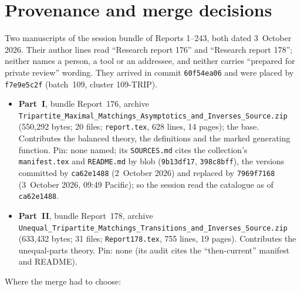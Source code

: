 \documentclass[11pt,letterpaper]{article}
\theoremstyle{remark}\newtheorem{remark}[theorem]{Remark}
\newcommand{\file}[1]{\nolinkurl{#1}}
\begin{document}
\section*{Provenance and merge decisions}\label{tmm:sec:provenance}
Two manuscripts of the session bundle of Reports 1--243, both dated 3~October 2026. Their author lines read ``Research report 176'' and ``Research report 178''; neither names a person, a tool or an addressee, and neither carries ``prepared for private review'' wording. They arrived in commit \texttt{60f54ea06} and were placed by \texttt{f7e9e5c2f} (batch~109, cluster 109-TRIP).
\begin{itemize}
\item \textbf{Part~I}, bundle Report~176, archive \file{Tripartite_Maximal_Matchings_Asymptotics_and_Inverses_Source.zip} (550,292 bytes; 20 files; \file{report.tex}, 628 lines, 14 pages); the base. Contributes the balanced theory, the definitions and the marked generating function. Pin: none named; its \file{SOURCES.md} cites the collection's \file{manifest.tex} and \file{README.md} by blob (\texttt{9b13df17}, \texttt{398c8bff}), the versions committed by \texttt{ca62e1488} (2~October 2026) and replaced by \texttt{7969f7168} (3~October 2026, 09:49 Pacific); so the session read the catalogue as of \texttt{ca62e1488}.
\item \textbf{Part~II}, bundle Report~178, archive \file{Unequal_Tripartite_Matchings_Transitions_and_Inverses_Source.zip} (633,432 bytes; 31 files; \file{Report178.tex}, 755 lines, 19 pages). Contributes the unequal-parts theory. Pin: none (its audit cites the ``then-current'' manifest and README).
\end{itemize}
Where the merge had to choose:
\end{document}
